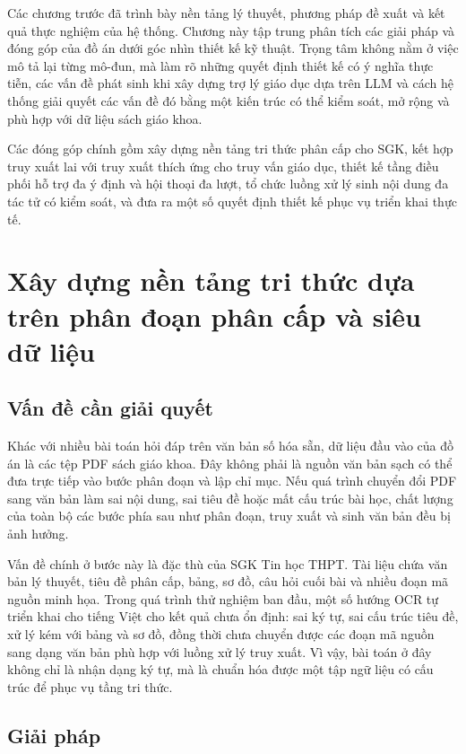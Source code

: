 \documentclass[../DoAn.tex]{subfiles}
\begin{document}
Các chương trước đã trình bày nền tảng lý thuyết, phương pháp đề xuất và kết quả thực nghiệm của hệ thống. Chương này tập trung phân tích các giải pháp và đóng góp của đồ án dưới góc nhìn thiết kế kỹ thuật. Trọng tâm không nằm ở việc mô tả lại từng mô-đun, mà làm rõ những quyết định thiết kế có ý nghĩa thực tiễn, các vấn đề phát sinh khi xây dựng trợ lý giáo dục dựa trên LLM và cách hệ thống giải quyết các vấn đề đó bằng một kiến trúc có thể kiểm soát, mở rộng và phù hợp với dữ liệu sách giáo khoa.

Các đóng góp chính gồm xây dựng nền tảng tri thức phân cấp cho SGK, kết hợp truy xuất lai với truy xuất thích ứng cho truy vấn giáo dục, thiết kế tầng điều phối hỗ trợ đa ý định và hội thoại đa lượt, tổ chức luồng xử lý sinh nội dung đa tác tử có kiểm soát, và đưa ra một số quyết định thiết kế phục vụ triển khai thực tế.

\section{Xây dựng nền tảng tri thức dựa trên phân đoạn phân cấp và siêu dữ liệu}

\subsection{Vấn đề cần giải quyết}

Khác với nhiều bài toán hỏi đáp trên văn bản số hóa sẵn, dữ liệu đầu vào của đồ án là các tệp PDF sách giáo khoa. Đây không phải là nguồn văn bản sạch có thể đưa trực tiếp vào bước phân đoạn và lập chỉ mục. Nếu quá trình chuyển đổi PDF sang văn bản làm sai nội dung, sai tiêu đề hoặc mất cấu trúc bài học, chất lượng của toàn bộ các bước phía sau như phân đoạn, truy xuất và sinh văn bản đều bị ảnh hưởng.

Vấn đề chính ở bước này là đặc thù của SGK Tin học THPT. Tài liệu chứa văn bản lý thuyết, tiêu đề phân cấp, bảng, sơ đồ, câu hỏi cuối bài và nhiều đoạn mã nguồn minh họa. Trong quá trình thử nghiệm ban đầu, một số hướng OCR tự triển khai cho tiếng Việt cho kết quả chưa ổn định: sai ký tự, sai cấu trúc tiêu đề, xử lý kém với bảng và sơ đồ, đồng thời chưa chuyển được các đoạn mã nguồn sang dạng văn bản phù hợp với luồng xử lý truy xuất. Vì vậy, bài toán ở đây không chỉ là nhận dạng ký tự, mà là chuẩn hóa được một tập ngữ liệu có cấu trúc để phục vụ tầng tri thức.

\subsection{Giải pháp}
\end{document}
